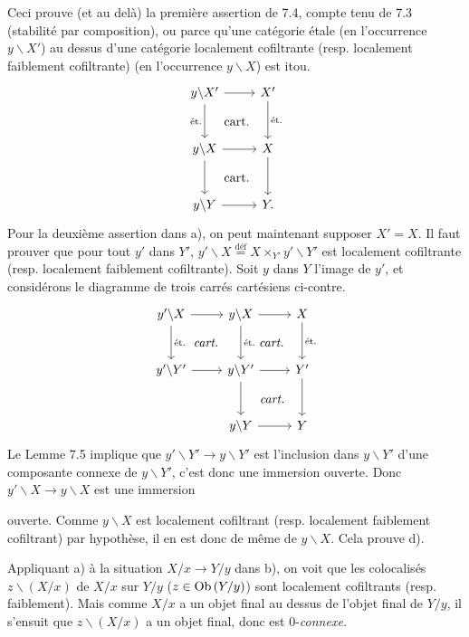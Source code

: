 Ceci prouve (et au delà) la première assertion de 7.4, compte tenu de 7.3 (stabilité par composition), ou parce qu'une  catégorie étale (en l'occurrence $y\backslash X'$) au dessus d'une catégorie localement cofiltrante (resp. localement faiblement cofiltrante) (en l'occurrence $y\backslash X$) est itou.
\[
\begin{tikzcd}[row sep=large]
y\backslash X' \arrow[r] \arrow[d, "\text{ét.}"'] \arrow[dr, phantom, "\text{cart.}"] & X' \arrow[d, "\text{ét.}"] \\
y\backslash X \arrow[r] \arrow[d] \arrow[dr, phantom, "\text{cart.}"] & X \arrow[d] \\
y\backslash Y \arrow[r] & Y.
\end{tikzcd}
\]
Pour la deuxième assertion dans a), on peut maintenant supposer $X' = X$. Il faut prouver que pour tout $y'$ dans $Y'$, $y'\backslash X \overset{\text{déf}}{=} X \times_{Y'} y'\backslash Y'$ est localement cofiltrante (resp. localement faiblement cofiltrante). Soit $y$ dans $Y$ l'image de $y'$, et considérons le diagramme de trois carrés cartésiens ci-contre.
\[
\begin{tikzcd}[row sep=large]
y'\backslash X \arrow[r] \arrow[d, "\text{ét.}"] \arrow[dr, phantom, "\textit{cart.}"] & y\backslash X \arrow[r] \arrow[d, "\text{ét.}"] \arrow[dr, phantom, "\textit{cart.}"] & X \arrow[d, "\text{ét.}"] \\
y'\backslash Y' \arrow[r] & y\backslash Y' \arrow[r] \arrow[d] \arrow[dr, phantom, "\textit{cart.}"] & Y' \arrow[d] \\
 & y\backslash Y \arrow[r] & Y
\end{tikzcd}
\]
Le Lemme 7.5 implique que $y'\backslash Y' \longrightarrow y\backslash Y'$ est l'inclusion dans $y\backslash Y'$ d'une composante connexe de $y\backslash Y'$, c'est donc une immersion ouverte. Donc $y'\backslash X \longrightarrow y\backslash X$ est une immersion


ouverte. Comme $y\backslash X$ est localement cofiltrant (resp. localement faiblement cofiltrant) par hypothèse, il en est donc de même de $y\backslash X$. Cela prouve d).

Appliquant a) à la situation $X/x \longrightarrow Y/y$ dans b), on voit que les colocalisés $z\backslash(X/x)$ de
\margmark{!} %
$X/x$ sur $Y/y$ ($z \in \operatorname{Ob}\,(Y/y)$) sont localement cofiltrants (resp. faiblement). Mais comme $X/x$ a un objet final au dessus de l'objet final de $Y/y$, il s'ensuit que $z\backslash(X/x)$ a un objet final, donc est $0$-\textit{connexe.}


